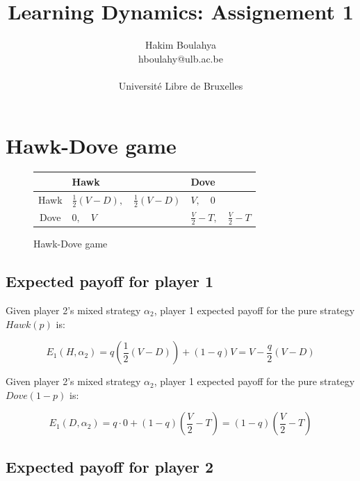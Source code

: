 \documentclass[letterpaper]{article}
\title{Learning Dynamics: Assignement 1}
\author{\Large Hakim Boulahya \\
hboulahy@ulb.ac.be\\
\\
Université Libre de Bruxelles
}
\begin{document}
\maketitle


\section{Hawk-Dove game}


\begin{figure}[!ht]


\begin{center}
\begin{tabular}{|c|C|C|}
    \hline
     & Hawk & Dove \\[10pt]
    \hline
    Hawk & $\frac{1}{2}(V - D), \quad \frac{1}{2}(V - D)$ & $V, \quad 0$\\[10pt]
    \hline
    Dove & $0, \quad V$ & $\frac{V}{2} - T, \quad \frac{V}{2} - T$\\[10pt]
    \hline
\end{tabular}
\end{center}

\caption{Hawk-Dove game}
\label{fig:hawkdove}
\end{figure}

\subsection{Expected payoff for player 1}

Given player 2’s mixed strategy $\alpha_2$, player 1 expected payoff
for the pure strategy $Hawk(p)$ is:

\begin{equation}
    E_1(H, \alpha_2) = q (\frac{1}{2}(V - D)) + (1 - q)V
    = V - \frac{q}{2}(V - D)
\end{equation}

Given player 2’s mixed strategy $\alpha_2$, player 1 expected payoff
for the pure strategy $Dove(1 - p)$ is:

\begin{equation}
    E_1(D, \alpha_2) = q \cdot 0 + (1 - q)(\frac{V}{2} - T)
    = (1 - q)(\frac{V}{2} - T)
\end{equation}

\subsection{Expected payoff for player 2}
\end{document}
